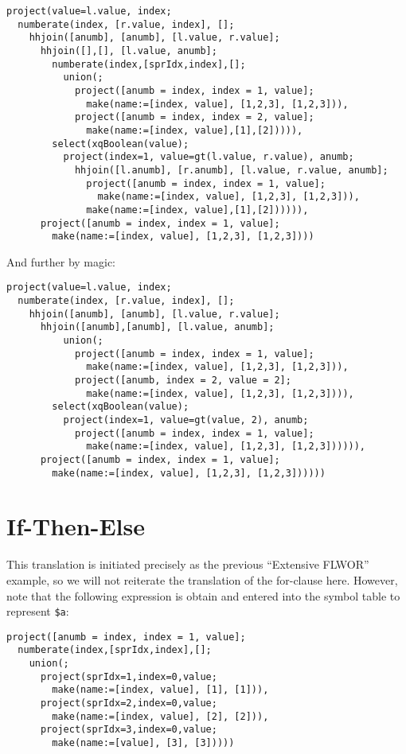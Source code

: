 \begin{Verbatim}
project(value=l.value, index;
  numberate(index, [r.value, index], [];
    hhjoin([anumb], [anumb], [l.value, r.value];
      hhjoin([],[], [l.value, anumb];
        numberate(index,[sprIdx,index],[];
          union(;
            project([anumb = index, index = 1, value];
              make(name:=[index, value], [1,2,3], [1,2,3])),
            project([anumb = index, index = 2, value];
              make(name:=[index, value],[1],[2])))),
        select(xqBoolean(value);
          project(index=1, value=gt(l.value, r.value), anumb;
            hhjoin([l.anumb], [r.anumb], [l.value, r.value, anumb];
              project([anumb = index, index = 1, value];
                make(name:=[index, value], [1,2,3], [1,2,3])),
              make(name:=[index, value],[1],[2]))))),
      project([anumb = index, index = 1, value];
        make(name:=[index, value], [1,2,3], [1,2,3])))
\end{Verbatim}

And further by magic:

\begin{Verbatim}
project(value=l.value, index;
  numberate(index, [r.value, index], [];
    hhjoin([anumb], [anumb], [l.value, r.value];
      hhjoin([anumb],[anumb], [l.value, anumb];
          union(;
            project([anumb = index, index = 1, value];
              make(name:=[index, value], [1,2,3], [1,2,3])),
            project([anumb, index = 2, value = 2];
              make(name:=[index, value], [1,2,3], [1,2,3]))),
        select(xqBoolean(value);
          project(index=1, value=gt(value, 2), anumb;
            project([anumb = index, index = 1, value];
              make(name:=[index, value], [1,2,3], [1,2,3]))))),
      project([anumb = index, index = 1, value];
        make(name:=[index, value], [1,2,3], [1,2,3])))))
\end{Verbatim}


\section{If-Then-Else}
\label{appendix:transl:ifthenelse}
This translation is initiated precisely as the previous ``Extensive FLWOR''
example, so we will not reiterate the translation of the for-clause here.
However, note that the following expression is obtain and entered into the
symbol table to represent \texttt{\$a}:

\begin{Verbatim}
project([anumb = index, index = 1, value];
  numberate(index,[sprIdx,index],[];
    union(;
      project(sprIdx=1,index=0,value;
        make(name:=[index, value], [1], [1])),
      project(sprIdx=2,index=0,value;
        make(name:=[index, value], [2], [2])),
      project(sprIdx=3,index=0,value;
        make(name:=[value], [3], [3]))))
\end{Verbatim}

